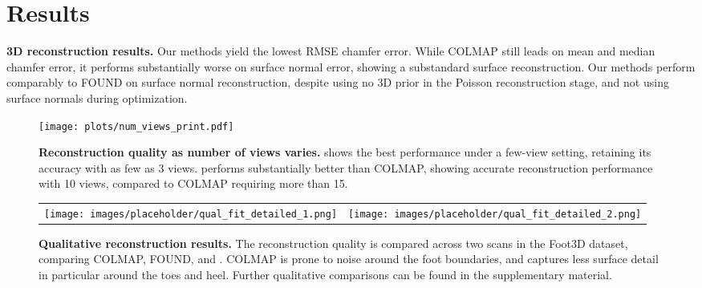 \section{Results}

\begin{table}[]
    \centering
    
    \begingroup
    \begin{footnotesize}
    \setlength{\tabcolsep}{4pt} %
    
    \end{footnotesize}
    \endgroup
    \caption{\textbf{3D reconstruction results.} Our methods yield the lowest RMSE chamfer error. While COLMAP still leads on mean and median chamfer error, it performs substantially worse on surface normal error, showing a substandard surface reconstruction. Our methods perform comparably to FOUND on surface normal reconstruction, despite \ourSfM using no 3D prior in the Poisson reconstruction stage, and \ourOptim not using surface normals during optimization.}
    \label{tab:3d_fit_results}
\end{table}

\begin{figure}
    \centering
    \texttt{[image: plots/num\_views\_print.pdf]}
    \caption{\textbf{Reconstruction quality as number of views varies.} \ourOptim shows the best performance under a few-view setting, retaining its accuracy with as few as 3 views. \ourSfM performs substantially better than COLMAP, showing accurate reconstruction performance with 10 views, compared to COLMAP requiring more than 15.}
    \label{fig:num_views}
\end{figure}

\begin{figure*}
    \centering
    \begin{tabular}{c|c}
        \texttt{[image: images/placeholder/qual\_fit\_detailed\_1.png]} &
        \texttt{[image: images/placeholder/qual\_fit\_detailed\_2.png]}
    \end{tabular}
    \caption{\textbf{Qualitative reconstruction results.} The reconstruction quality is compared across two scans in the Foot3D dataset, comparing COLMAP, FOUND, \ourSfM and \ourOptim. COLMAP is prone to noise around the foot boundaries, and captures less surface detail in particular around the toes and heel.
    Further qualitative comparisons can be found in the supplementary material.}
    \label{fig:3d_fits_qual}
\end{figure*}

